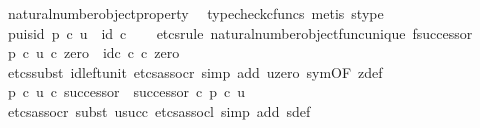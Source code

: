 \begin{isabellebody}
\ natural{\isacharunderscore}{\kern0pt}number{\isacharunderscore}{\kern0pt}object{\isacharunderscore}{\kern0pt}property{}\ \isamarkupfalse%
\ {\isacharparenleft}{\kern0pt}typecheck{\isacharunderscore}{\kern0pt}cfuncs{\isacharcomma}{\kern0pt}\ metis\ s{\isacharprime}{\kern0pt}{\isacharunderscore}{\kern0pt}type{\isacharparenright}{\kern0pt}\isanewline
\isanewline
\ \ \isamarkupfalse%
\ p{\isacharprime}{\kern0pt}{\isacharunderscore}{\kern0pt}u{\isacharunderscore}{\kern0pt}is{\isacharunderscore}{\kern0pt}id{\isacharcolon}{\kern0pt}\ {\isachardoublequoteopen}p{\isacharprime}{\kern0pt}\ {\isasymcirc}\isactrlsub c\ u\ {\isacharequal}{\kern0pt}\ id\ {\isasymnat}\isactrlsub c{\isachardoublequoteclose}\isanewline
\ \ \isamarkupfalse%
\ {\isacharparenleft}{\kern0pt}etcs{\isacharunderscore}{\kern0pt}rule\ natural{\isacharunderscore}{\kern0pt}number{\isacharunderscore}{\kern0pt}object{\isacharunderscore}{\kern0pt}func{\isacharunderscore}{\kern0pt}unique{\isacharbrackleft}{\kern0pt}\ f{\isacharequal}{\kern0pt}successor{\isacharbrackright}{\kern0pt}{\isacharparenright}{\kern0pt}\isanewline
\ \ \ \ \isamarkupfalse%
\ {\isachardoublequoteopen}{\isacharparenleft}{\kern0pt}p{\isacharprime}{\kern0pt}\ {\isasymcirc}\isactrlsub c\ u{\isacharparenright}{\kern0pt}\ {\isasymcirc}\isactrlsub c\ zero\ {\isacharequal}{\kern0pt}\ id\isactrlsub c\ {\isasymnat}\isactrlsub c\ {\isasymcirc}\isactrlsub c\ zero{\isachardoublequoteclose}\isanewline
\ \ \ \ \ \ \isamarkupfalse%
\ {\isacharparenleft}{\kern0pt}etcs{\isacharunderscore}{\kern0pt}subst\ id{\isacharunderscore}{\kern0pt}left{\isacharunderscore}{\kern0pt}unit{}{\isacharcomma}{\kern0pt}\ etcs{\isacharunderscore}{\kern0pt}assocr{\isacharcomma}{\kern0pt}\ simp\ add{\isacharcolon}{\kern0pt}\ u{\isacharunderscore}{\kern0pt}zero\ sym{\isacharbrackleft}{\kern0pt}OF\ z{\isacharprime}{\kern0pt}{\isacharunderscore}{\kern0pt}def{\isacharbrackright}{\kern0pt}{\isacharparenright}{\kern0pt}\isanewline
\ \ \ \ \isamarkupfalse%
\ {\isachardoublequoteopen}{\isacharparenleft}{\kern0pt}p{\isacharprime}{\kern0pt}\ {\isasymcirc}\isactrlsub c\ u{\isacharparenright}{\kern0pt}\ {\isasymcirc}\isactrlsub c\ successor\ {\isacharequal}{\kern0pt}\ successor\ {\isasymcirc}\isactrlsub c\ p{\isacharprime}{\kern0pt}\ {\isasymcirc}\isactrlsub c\ u{\isachardoublequoteclose}\isanewline
\ \ \ \ \ \ \isamarkupfalse%
\ {\isacharparenleft}{\kern0pt}etcs{\isacharunderscore}{\kern0pt}assocr{\isacharcomma}{\kern0pt}\ subst\ u{\isacharunderscore}{\kern0pt}succ{\isacharcomma}{\kern0pt}\ etcs{\isacharunderscore}{\kern0pt}assocl{\isacharcomma}{\kern0pt}\ simp\ add{\isacharcolon}{\kern0pt}\ s{\isacharprime}{\kern0pt}{\isacharunderscore}{\kern0pt}def{\isacharparenright}{\kern0pt}\isanewline

\end{isabellebody}
